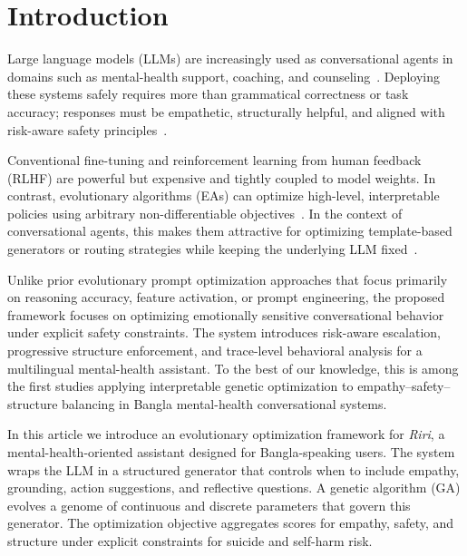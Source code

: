 \documentclass[mathematics,article,xetex,moreauthors]{Definitions/mdpi}
\begin{document}

\section{Introduction}

Large language models (LLMs) are increasingly used as conversational agents in
domains such as mental-health support, coaching, and
counseling~\cite{jmir2025_chatbots,pmc2026_chatbots}. Deploying these systems
safely requires more than grammatical correctness or task accuracy; responses
must be empathetic, structurally helpful, and aligned with risk-aware safety
principles~\cite{jmir2024_empathic,apa2024_advisory,harvard2024_safety}.

Conventional fine-tuning and reinforcement learning from human feedback (RLHF)
are powerful but expensive and tightly coupled to model weights. In contrast,
evolutionary algorithms (EAs) can optimize high-level, interpretable policies
using arbitrary non-differentiable
objectives~\cite{llm_ea_survey2025,when_llms_meet_ea2025}. In the context of
conversational agents, this makes them attractive for optimizing template-based
generators or routing strategies while keeping the underlying LLM
fixed~\cite{mles2026,gendl2025}.

Unlike prior evolutionary prompt optimization approaches that focus primarily on
reasoning accuracy, feature activation, or prompt engineering, the proposed
framework focuses on optimizing emotionally sensitive conversational behavior
under explicit safety constraints. The system introduces risk-aware escalation,
progressive structure enforcement, and trace-level behavioral analysis for a
multilingual mental-health assistant. To the best of our knowledge, this is
among the first studies applying interpretable genetic optimization to
empathy--safety--structure balancing in Bangla mental-health conversational
systems.

In this article we introduce an evolutionary optimization framework for
\emph{Riri}, a mental-health-oriented assistant designed for Bangla-speaking
users. The system wraps the LLM in a structured generator that controls when to
include empathy, grounding, action suggestions, and reflective questions. A
genetic algorithm (GA) evolves a genome of continuous and discrete parameters
that govern this generator. The optimization objective aggregates scores for
empathy, safety, and structure under explicit constraints for suicide and
self-harm risk.
\end{document}
